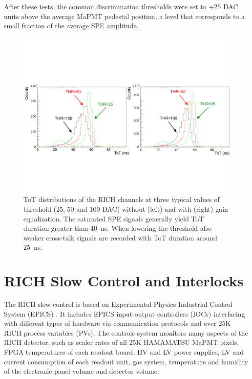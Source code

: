 \documentclass[5p,times,twocolumn]{elsarticle}
\begin{document}
After these tests, the common discrimination thresholds were set to +25 DAC units above the average MaPMT pedestal position, a level that corresponds to a small fraction of the average SPE amplitude.

\begin{figure}[t]
\begin{center}
\includegraphics[width=1.0\columnwidth]{Figure6.pdf}
\end{center}
\caption{ToT distributions of the RICH channels at three typical values of threshold (25, 50 and 100 DAC) without (left) and with (right) gain equalization. The saturated SPE signals generally yield ToT duration greater than 40~ns. When lowering the threshold also weaker cross-talk signals are recorded with ToT duration around 25~ns.}
\label{Fig:Equali}
\end{figure}



\section{RICH Slow Control and Interlocks}
\label{sec:SlowControl}

The RICH slow control is based on Experimental Physics Industrial Control System (EPICS) \cite{Ref:EPICS}. It includes EPICS input-output controllers (IOCs) interfacing with  different types of hardware via  communication protocols and over 25K RICH process variables (PVs).
The controls system monitors  many aspects of the RICH detector, such as scaler rates of all 25K HAMAMATSU MaPMT pixels, FPGA temperatures  of each readout board, HV and LV power supplies, LV and current consumption of each readout unit, gas system, temperature and humidity of the electronic panel volume and detector volume.
\end{document}
